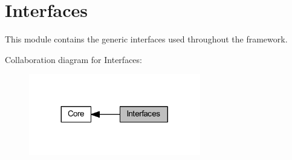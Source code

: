 \hypertarget{group___interfaces}{}\section{Interfaces}
\label{group___interfaces}


This module contains the generic interfaces used throughout the framework.  


Collaboration diagram for Interfaces\+:
\nopagebreak
\begin{figure}[H]
\begin{center}
\leavevmode
\includegraphics[width=212pt]{group___interfaces}
\end{center}
\end{figure}
